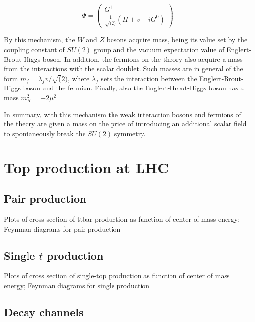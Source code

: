\begin{equation}
  \label{eq:TransHiggsDoublet}
  \Phi=\left(
    \begin{array}{c}
      G^{+} \\
      \frac{1}{\sqrt(2)}(H+v-iG^{0})
    \end{array}
  \right)
\end{equation}

By this mechanism, the $W$ and $Z$ bosons acquire mass, being its value set by the coupling constant of $SU(2)$ group and the vacuum expectation value of Englert-Brout-Higgs boson. In addition, the fermions on the theory also acquire a mass from the interactions with the scalar doublet. Such masses are in general of the form $m_{f}=\lambda_{f}v/\sqrt(2)$, where $\lambda_{f}$ sets the interaction between the Englert-Brout-Higgs boson and the fermion. Finally, also the Englert-Brout-Higgs boson has a mass $m_{H}^{2}=-2\mu^{2}$.

In summary, with this mechanism the weak interaction bosons and fermions of the theory are given a mass on the price of introducing an additional scalar field to spontaneously break the $SU(2)$ symmetry.

\section{Top production at LHC}

\subsection{Pair production}

\begin{TOINCLUDE}Plots of cross section of ttbar production as function of center of mass energy; Feynman diagrams for pair production\end{TOINCLUDE}

\subsection{Single $t$ production}

\begin{TOINCLUDE}Plots of cross section of single-top production as function of center of mass energy; Feynman diagrams for single production\end{TOINCLUDE}

\subsection{Decay channels}

